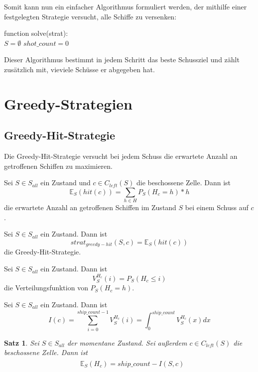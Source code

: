 \documentclass[a4paper,12pt]{llncs}
\numberwithin{equation}{section}
\newtheorem{satz}{Satz}
\begin{document}
Somit kann nun ein einfacher Algorithmus formuliert werden, der mithilfe einer festgelegten Strategie versucht, alle Schiffe zu versenken:

\begin{algorithm}[H]
 function solve(strat):\\
 $S=\emptyset$\;
 $shot\_count=0$\;
\end{algorithm}

Dieser Algorithmus bestimmt in jedem Schritt das beste Schussziel und zählt zusätzlich mit, vieviele Schüsse er abgegeben hat.

\section{Greedy-Strategien}

\subsection{Greedy-Hit-Strategie}
Die Greedy-Hit-Strategie versucht bei jedem Schuss die erwartete Anzahl an getroffenen Schiffen zu maximieren.

\begin{definition}
Sei $S\in S_{all}$ ein Zustand und $c \in C_{left}(S)$ die beschossene Zelle.
Dann ist
\[
\mathds{E}_S(hit(c))=\sum_{h \in H} P_S(H_{c}=h) * h
\]
die erwartete Anzahl an getroffenen Schiffen im Zustand $S$ bei einem Schuss auf $c$.
\end{definition}

\begin{definition}
Sei $S\in S_{all}$ ein Zustand.
Dann ist
\[
strat_{greedy-hit}(S,c)=\mathds{E}_S(hit(c))
\]
die Greedy-Hit-Strategie.
\end{definition}

\begin{definition}
Sei $S\in S_{all}$ ein Zustand.
Dann ist
\[
V_S^{H_{c}}(i)=P_S(H_{c} \leq i)
\]
die Verteilungsfunktion von $P_S(H_{c}=h)$.
\end{definition}

\begin{definition}
Sei $S\in S_{all}$ ein Zustand.
Dann ist
\[
I(c)=\sum_{i=0}^{ship\_count - 1} V_S^{H_{c}}(i)=\int_{0}^{ship\_count} V_S^{H_{c}}(x) dx
\]
\end{definition}

\begin{satz}
Sei $S\in S_{all}$ der momentane Zustand.
Sei außerdem $c \in C_{left}(S)$ die beschossene Zelle.
Dann ist
\begin{align}
\begin{split}
&\mathds{E}_S(H_c)=ship\_count - I(S,c)
\end{split}
\end{align}
\end{satz}
\end{document}
